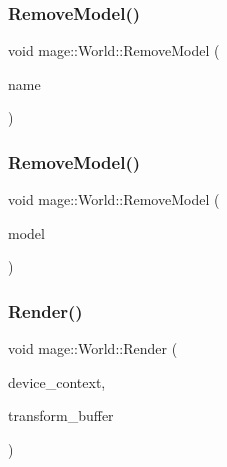 \hypertarget{classmage_1_1_world_aebba267c6c47de1c806ffe49be273dea}{}\label{classmage_1_1_world_aebba267c6c47de1c806ffe49be273dea} 
\subsubsection{\texorpdfstring{Remove\+Model()}{RemoveModel()}\hspace{0.1cm}{\footnotesize\ttfamily [1/2]}}
{\footnotesize\ttfamily void mage\+::\+World\+::\+Remove\+Model (\begin{DoxyParamCaption}\item[{const string \&}]{name }\end{DoxyParamCaption})}

\hypertarget{classmage_1_1_world_afad0c7024fcd304bb582bdc1d281c590}{}\label{classmage_1_1_world_afad0c7024fcd304bb582bdc1d281c590} 
\subsubsection{\texorpdfstring{Remove\+Model()}{RemoveModel()}\hspace{0.1cm}{\footnotesize\ttfamily [2/2]}}
{\footnotesize\ttfamily void mage\+::\+World\+::\+Remove\+Model (\begin{DoxyParamCaption}\item[{\hyperlink{namespacemage_a1e01ae66713838a7a67d30e44c67703e}{Shared\+Ptr}$<$ \hyperlink{classmage_1_1_model}{Model} $>$}]{model }\end{DoxyParamCaption})}

\hypertarget{classmage_1_1_world_a9431fb26a3545cb10c3d380e17c24968}{}\label{classmage_1_1_world_a9431fb26a3545cb10c3d380e17c24968} 
\subsubsection{\texorpdfstring{Render()}{Render()}}
{\footnotesize\ttfamily void mage\+::\+World\+::\+Render (\begin{DoxyParamCaption}\item[{\hyperlink{namespacemage_ae74f374780900893caa5555d1031fd79}{Com\+Ptr}$<$ I\+D3\+D11\+Device\+Context2 $>$}]{device\+\_\+context,  }\item[{const \hyperlink{structmage_1_1_transform_buffer}{Transform\+Buffer} \&}]{transform\+\_\+buffer }\end{DoxyParamCaption})}



